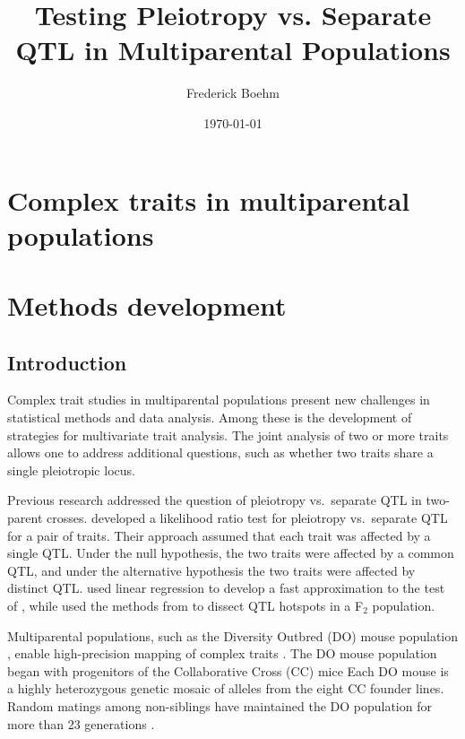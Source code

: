 \documentclass[oneside]{book}
\title{Testing Pleiotropy vs. Separate QTL in Multiparental Populations}
\author{Frederick Boehm}
\date{\today}
\begin{document}
\frontmatter %
\doublespacing
\maketitle
\tableofcontents
\listoffigures
\listoftables
\mainmatter %

\chapter{Complex traits in multiparental populations}


\chapter{Methods development}


\section{Introduction}

Complex trait studies in multiparental populations present new
challenges in statistical methods and data analysis. Among these is
the development of strategies for multivariate trait analysis. The
joint analysis of two or more traits allows one to address additional
questions, such as whether two traits share a single pleiotropic
locus.




Previous research addressed the question of pleiotropy vs.\ separate
QTL in two-parent crosses.
\citet{jiang1995multiple} developed a likelihood
ratio test for pleiotropy vs.\ separate QTL for a pair of traits.
Their approach assumed that each trait was affected by a single QTL.
Under the null hypothesis, the two traits were affected by a common
QTL, and under the alternative hypothesis the two traits were affected
by distinct QTL.
\citet{knott2000multitrait} used linear regression to develop a fast
approximation to the test of \citet{jiang1995multiple}, while
\citet{tian2016dissection} used the methods from
\citet{knott2000multitrait} to dissect QTL hotspots in a F$_2$
population.


Multiparental populations, such
as the Diversity Outbred (DO) mouse population \citep{churchill2012diversity}, enable high-precision
mapping of complex traits \citep{de2014genetics}. The DO
mouse population began with progenitors of the Collaborative
Cross (CC) mice \citep{churchill2004collaborative}
Each DO mouse is a highly heterozygous genetic mosaic
of alleles from the eight CC founder lines. Random
matings among non-siblings have maintained the DO
population for more than 23 generations \citep{chesler2016diversity}.
\end{document}

